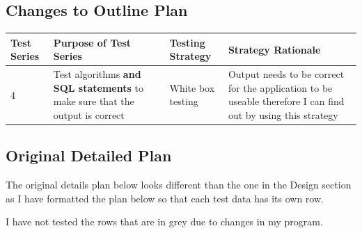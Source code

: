 \begin{landscape}
\subsection{Changes to Outline Plan}

\begin{center}
    \begin{tabular}{|p{2cm}|p{5cm}|p{5cm}|p{4cm}|}
        \hline
        \textbf{Test Series} & \textbf{Purpose of Test Series} & \textbf{Testing Strategy} & \textbf{Strategy Rationale}\\ \hline
	4 & Test algorithms \textbf{and SQL statements} to make sure that the output is correct & White box testing & Output needs to be correct for the application to be useable therefore I can find out by using this strategy \\ \hline
    \end{tabular}
\end{center}

\subsection{Original Detailed Plan}
The original details plan below looks different than the one in the Design section as I have formatted the plan below so that each test data has its own row.

I have not tested the rows that are in grey due to changes in my program.


\end{landscape}
